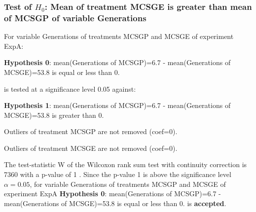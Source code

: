 \begin{frame}[t]
 \frametitle{Test of $H_{0}$: Mean of treatment MCSGE is greater than mean of MCSGP of variable Generations }
 \scriptsize
 For variable Generations of treatments MCSGP and MCSGE of experiment ExpA:

\vspace{1mm}
{\bf Hypothesis 0}: mean(Generations of MCSGP)=6.7 - mean(Generations of MCSGE)=53.8 is equal or less than 0.


 \begin{center} is tested at a significance level 0.05 against: \end{center}

{\bf Hypothesis 1}: mean(Generations of MCSGP)=6.7 - mean(Generations of MCSGE)=53.8 is greater than 0.
\vspace{1mm}
\vspace{1mm}

 Outliers of treatment MCSGP  are not removed (coef=0).

 Outliers of treatment MCSGE  are not removed (coef=0).
\vspace{1mm}
 
 The test-statistic W of the Wilcoxon rank sum test with continuity correction is 7360 with a p-value of 1 .
 Since the p-value 1 is above the significance level $\alpha= 0.05 $,
 for variable Generations of treatments MCSGP and MCSGE of experiment ExpA 
 {\bf Hypothesis 0}: mean(Generations of MCSGP)=6.7 - mean(Generations of MCSGE)=53.8 is equal or less than 0.
is {\bf accepted}.

 \end{frame}
